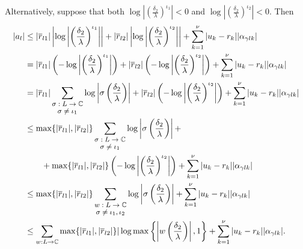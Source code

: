 Alternatively, suppose that both $\log\left|\left(\frac{\delta_2}{\lambda}\right)^{\iota_1}\right| < 0$ and $\log\left|\left(\frac{\delta_2}{\lambda}\right)^{\iota_2}\right| < 0$. Then
\begin{align*}
|a_l| 	& \leq |\overline{r}_{l1}|\left|\log\left|\left(\frac{\delta_2}{\lambda}\right)^{\iota_1}\right|\right| + |\overline{r}_{l2}|\left|\log\left|\left(\frac{\delta_2}{\lambda}\right)^{\iota_2}\right|\right| + \sum_{k=1}^{\nu}|u_k-r_k||\alpha_{\gamma l k}|\\
	& = |\overline{r}_{l1}|\left(-\log\left|\left(\frac{\delta_2}{\lambda}\right)^{\iota_1}\right|\right) + |\overline{r}_{l2}|\left(-\log\left|\left(\frac{\delta_2}{\lambda}\right)^{\iota_2}\right|\right) + \sum_{k=1}^{\nu}|u_k-r_k||\alpha_{\gamma l k}|\\
	& = |\overline{r}_{l1}|\sum_{\shortstack{\footnotesize $\sigma: L \to \mathbb{C} $\\ \footnotesize $ \sigma \neq \iota_1$}} \log\left|\sigma \left(\frac{\delta_2}{\lambda}\right)\right|+ |\overline{r}_{l2}|\left(-\log\left|\left(\frac{\delta_2}{\lambda}\right)^{\iota_2}\right|\right) + \sum_{k=1}^{\nu}|u_k-r_k||\alpha_{\gamma l k}|\\
	& \leq \max\{|\overline{r}_{l1}|, |\overline{r}_{l2}|\}\sum_{\shortstack{\footnotesize $\sigma: L \to \mathbb{C} $\\ \footnotesize $ \sigma \neq \iota_1$}} \log\left|\sigma \left(\frac{\delta_2}{\lambda}\right)\right| +\\
	& \quad \quad +\max\{|\overline{r}_{l1}|, |\overline{r}_{l2}|\}\left(-\log\left|\left(\frac{\delta_2}{\lambda}\right)^{\iota_2}\right|\right) + \sum_{k=1}^{\nu}|u_k-r_k||\alpha_{\gamma l k}|\\
	& \leq \max\{|\overline{r}_{l1}|, |\overline{r}_{l2}|\}\sum_{\shortstack{\footnotesize $w: L \to \mathbb{C} $\\ \footnotesize $ \sigma \neq \iota_1, \iota_2$}} \log\left|\sigma \left(\frac{\delta_2}{\lambda}\right)\right|  + \sum_{k=1}^{\nu}|u_k-r_k||\alpha_{\gamma l k}|\\
	&  \leq \sum_{w: L \to \mathbb{C}}\max\{|\overline{r}_{l1}|, |\overline{r}_{l2}|\}|\log\max\left\{\left|w\left(\frac{\delta_2}{\lambda}\right)\right|,1\right\} + \sum_{k=1}^{\nu}|u_k-r_k||\alpha_{\gamma l k}|.
\end{align*}

